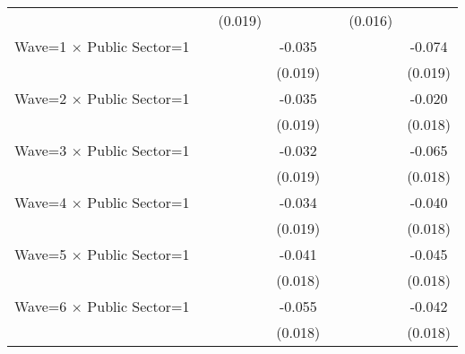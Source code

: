 {\begin{tabular}{l*{6}{c}}
                    &                     &     (0.019)         &                     &                     &     (0.016)         &                     \\
Wave=1 $\times$ Public Sector=1&                     &                     &      -0.035\sym{*}  &                     &                     &      -0.074\sym{***}\\
                    &                     &                     &     (0.019)         &                     &                     &     (0.019)         \\
Wave=2 $\times$ Public Sector=1&                     &                     &      -0.035\sym{*}  &                     &                     &      -0.020         \\
                    &                     &                     &     (0.019)         &                     &                     &     (0.018)         \\
Wave=3 $\times$ Public Sector=1&                     &                     &      -0.032\sym{*}  &                     &                     &      -0.065\sym{***}\\
                    &                     &                     &     (0.019)         &                     &                     &     (0.018)         \\
Wave=4 $\times$ Public Sector=1&                     &                     &      -0.034\sym{*}  &                     &                     &      -0.040\sym{**} \\
                    &                     &                     &     (0.019)         &                     &                     &     (0.018)         \\
Wave=5 $\times$ Public Sector=1&                     &                     &      -0.041\sym{**} &                     &                     &      -0.045\sym{**} \\
                    &                     &                     &     (0.018)         &                     &                     &     (0.018)         \\
Wave=6 $\times$ Public Sector=1&                     &                     &      -0.055\sym{***}&                     &                     &      -0.042\sym{**} \\
                    &                     &                     &     (0.018)         &                     &                     &     (0.018)         \\

\end{tabular}}
